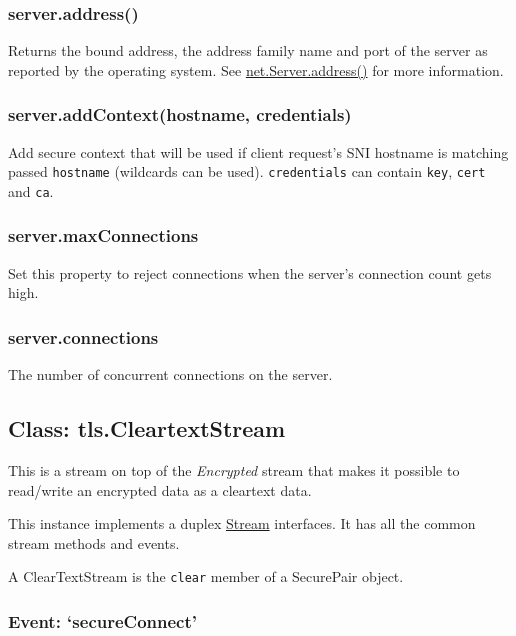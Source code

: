 \subsubsection{server.address()}

Returns the bound address, the address family name and port of the
server as reported by the operating system. See
\href{net.html\#net\_server\_address}{net.Server.address()} for more
information.

\subsubsection{server.addContext(hostname, credentials)}

Add secure context that will be used if client request's SNI hostname is
matching passed \texttt{hostname} (wildcards can be used).
\texttt{credentials} can contain \texttt{key}, \texttt{cert} and
\texttt{ca}.

\subsubsection{server.maxConnections}

Set this property to reject connections when the server's connection
count gets high.

\subsubsection{server.connections}

The number of concurrent connections on the server.

\subsection{Class: tls.CleartextStream}

This is a stream on top of the \emph{Encrypted} stream that makes it
possible to read/write an encrypted data as a cleartext data.

This instance implements a duplex
\href{stream.html\#stream\_stream}{Stream} interfaces. It has all the
common stream methods and events.

A ClearTextStream is the \texttt{clear} member of a SecurePair object.

\subsubsection{Event: `secureConnect'}

